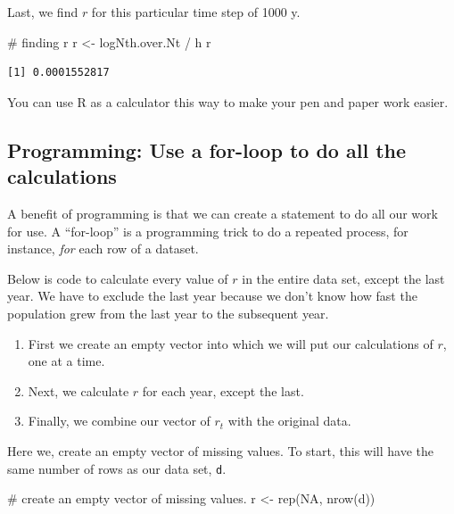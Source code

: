\documentclass[
  letterpaper,
  DIV=11,
  numbers=noendperiod]{scrreprt}
\newenvironment{Shaded}{\begin{snugshade}}{\end{snugshade}}
\newcommand{\CommentTok}[1]{\textcolor[rgb]{0.37,0.37,0.37}{#1}}
\newcommand{\ConstantTok}[1]{\textcolor[rgb]{0.56,0.35,0.01}{#1}}
\newcommand{\FunctionTok}[1]{\textcolor[rgb]{0.28,0.35,0.67}{#1}}
\newcommand{\NormalTok}[1]{\textcolor[rgb]{0.00,0.23,0.31}{#1}}
\newcommand{\OtherTok}[1]{\textcolor[rgb]{0.00,0.23,0.31}{#1}}
\newcommand{\SpecialCharTok}[1]{\textcolor[rgb]{0.37,0.37,0.37}{#1}}
\providecommand{\tightlist}{%
  \setlength{\itemsep}{0pt}\setlength{\parskip}{0pt}}
\begin{document}
Last, we find \(r\) for this particular time step of 1000 y.

\begin{Shaded}
\begin{Highlighting}[]
\CommentTok{\# finding r}
\NormalTok{r }\OtherTok{\textless{}{-}}\NormalTok{ logNth.over.Nt }\SpecialCharTok{/}\NormalTok{ h}
\NormalTok{r}
\end{Highlighting}
\end{Shaded}

\begin{verbatim}
[1] 0.0001552817
\end{verbatim}

You can use R as a calculator this way to make your pen and paper work
easier.

\subsection{Programming: Use a for-loop to do all the
calculations}\label{programming-use-a-for-loop-to-do-all-the-calculations}

A benefit of programming is that we can create a statement to do all our
work for use. A ``for-loop'' is a programming trick to do a repeated
process, for instance, \emph{for} each row of a dataset.

Below is code to calculate every value of \(r\) in the entire data set,
except the last year. We have to exclude the last year because we don't
know how fast the population grew from the last year to the subsequent
year.

\begin{enumerate}
\def\labelenumi{\arabic{enumi}.}
\tightlist
\item
  First we create an empty vector into which we will put our
  calculations of \(r\), one at a time.
\item
  Next, we calculate \(r\) for each year, except the last.
\item
  Finally, we combine our vector of \(r_t\) with the original data.
\end{enumerate}

Here we, create an empty vector of missing values. To start, this will
have the same number of rows as our data set, \texttt{d}.

\begin{Shaded}
\begin{Highlighting}[]
\CommentTok{\# create an empty vector of missing values.}
\NormalTok{r }\OtherTok{\textless{}{-}} \FunctionTok{rep}\NormalTok{(}\ConstantTok{NA}\NormalTok{, }\FunctionTok{nrow}\NormalTok{(d))}
\end{Highlighting}
\end{Shaded}
\end{document}
